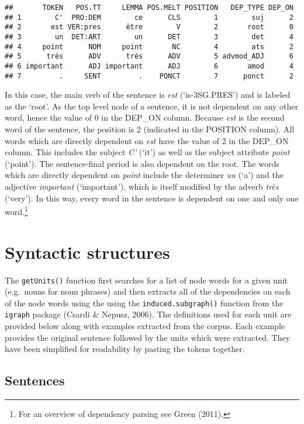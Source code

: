 \documentclass[
]{article}
\begin{document}
\begin{verbatim}
##       TOKEN   POS.TT     LEMMA POS.MELT POSITION   DEP_TYPE DEP_ON
## 1        C'  PRO:DEM        ce      CLS        1        suj      2
## 2       est VER:pres      être        V        2       root      0
## 3        un  DET:ART        un      DET        3        det      4
## 4     point      NOM     point       NC        4        ats      2
## 5      très      ADV      très      ADV        5 advmod_ADJ      6
## 6 important      ADJ important      ADJ        6       amod      4
## 7         .     SENT         .    PONCT        7      ponct      2
\end{verbatim}

In this case, the main verb of the sentence is \emph{est}
(`is-3SG.PRES') and is labeled as the `root'. As the top level node of a
sentence, it is not dependent on any other word, hence the value of 0 in
the DEP\_ON column. Because \emph{est} is the second word of the
sentence, the position is 2 (indicated in the POSITION column). All
words which are directly dependent on \emph{est} have the value of 2 in
the DEP\_ON column. This includes the subject \emph{C'} (`it') as well
as the subject attribute \emph{point} (`point'). The sentence-final
period is also dependent on the root. The words which are directly
dependent on \emph{point} include the determiner \emph{un} (`a') and the
adjective \emph{important} (`important'), which is itself modified by
the adverb \emph{très} (`very'). In this way, every word in the sentence
is dependent on one and only one word.\footnote{For an overview of
  dependency parsing see Green (2011).}

\hypertarget{syntactic-structures}{%
\section{Syntactic structures}\label{syntactic-structures}}

The \texttt{getUnits()} function first searches for a list of node words
for a given unit (e.g.~nouns for noun phrases) and then extracts all of
the dependencies on each of the node words using the using the
\texttt{induced.subgraph()} function from the \texttt{igraph} package
(Csardi \& Nepusz, 2006). The definitions used for each unit are
provided below along with examples extracted from the corpus. Each
example provides the original sentence followed by the units which were
extracted. They have been simplified for readability by pasting the
tokens together.

\hypertarget{sentences}{%
\subsection{Sentences}\label{sentences}}
\end{document}
